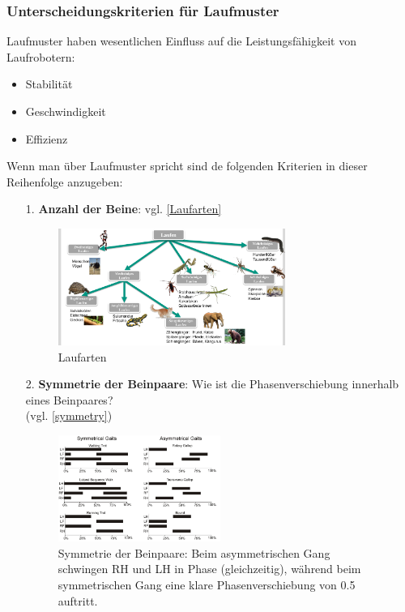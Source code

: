 \subsubsection{Unterscheidungskriterien für Laufmuster}
Laufmuster haben wesentlichen Einfluss auf die Leistungsfähigkeit von Laufrobotern:
\begin{itemize}
\item Stabilität
\item Geschwindigkeit
\item Effizienz
\end{itemize}
Wenn man über Laufmuster spricht sind de folgenden Kriterien in dieser Reihenfolge anzugeben:
\begin{itemize}
\item[1.] \textbf{Anzahl der Beine}: vgl. \autoref{Laufarten}
\begin{figure}[h!]
	\centering
	\includegraphics[width=0.7\textwidth]{figures/ch06_beinanzahl.png}
	\caption{Laufarten}
	\label{Laufarten}
\end{figure}
\item[2.] \textbf{Symmetrie der Beinpaare}: Wie ist die Phasenverschiebung innerhalb eines Beinpaares?\\(vgl. \autoref{symmetry})
\begin{figure}[h!]
	\centering
	\includegraphics[width=0.5\textwidth]{figures/ch06_symmetry.png}
	\caption{Symmetrie der Beinpaare: Beim asymmetrischen Gang schwingen RH und LH in Phase (gleichzeitig), während beim symmetrischen Gang eine klare Phasenverschiebung von 0.5 auftritt.}
	\label{symmetry}
\end{figure}

\end{itemize}
